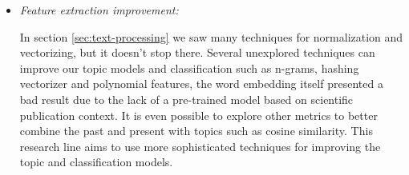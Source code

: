 \begin{itemize}

	\item \textit{Feature extraction improvement:}
	
	In section \ref{sec:text-processing} we saw many techniques for normalization and vectorizing, but it doesn't stop there. Several unexplored techniques can improve our topic models and classification such as n-grams, hashing vectorizer and polynomial features, the word embedding itself presented a bad result due to the lack of a pre-trained model based on scientific publication context.
	It is even possible to explore other metrics to better combine the past and present with topics such as cosine similarity.
	This research line aims to use more sophisticated techniques for improving the topic and classification models.
	
	
\end{itemize}
